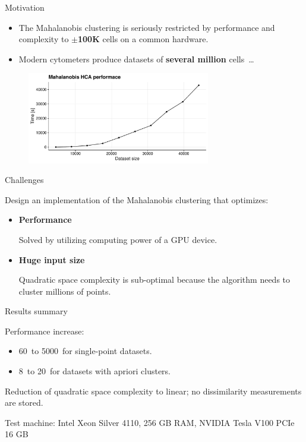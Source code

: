 \documentclass[10pt]{beamer}
\begin{document}
\begin{frame}{Motivation}
	\begin{itemize}
		\item The Mahalanobis clustering is seriously restricted by performance and complexity to \textbf{$\pm$100K} cells on a common hardware.
	
		\item Modern cytometers produce datasets of \textbf{several million} cells~\dots
	\end{itemize}
	\begin{figure}
	\includegraphics[width=8cm]{img/scalability}
	\end{figure}

\end{frame}

\begin{frame}{Challenges}
	
	Design an implementation of the Mahalanobis clustering that optimizes:
	\begin{itemize}
		\item \textbf{Performance}
		
		Solved by utilizing computing power of a GPU device.
		\item \textbf{Huge input size}
		
		Quadratic space complexity is sub-optimal because the algorithm needs to cluster millions of points.
	\end{itemize}
	
\end{frame}

\begin{frame}{Results summary}
	
	Performance increase:
	\begin{itemize}
		\item 60\texttimes\ to 5000\texttimes\ for single-point datasets.
		\item 8\texttimes\ to 20\texttimes\ for datasets with apriori clusters.
	\end{itemize}

	Reduction of quadratic space complexity to linear; no dissimilarity measurements are stored.
	
	Test machine: Intel Xeon Silver 4110, 256 GB
	RAM, NVIDIA Tesla V100 PCIe 16 GB
	
\end{frame}
\end{document}
